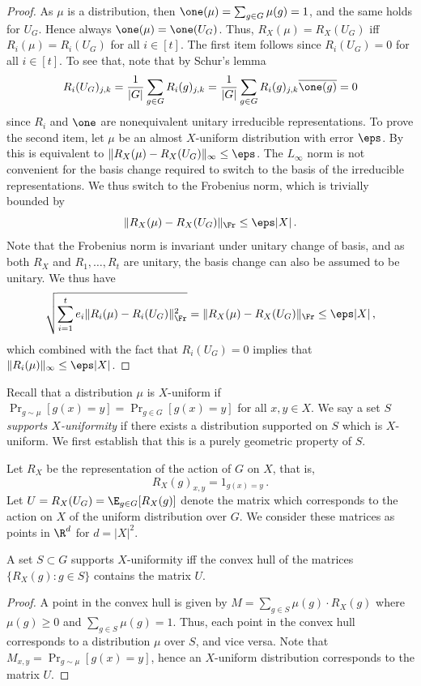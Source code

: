 \begin{proof}
As $\mu$ is a distribution, then $\one(\mu) =
\sum_{g \in G}\mu(g)=1$, and the same holds for $U_G$. Hence always
$\one(\mu)=\one(U_G)$. Thus, $R_X(\mu)=R_X(U_G)$ iff $R_i(\mu)=R_i(U_G)$
for all $i \in [t]$. The first item follows since $R_i(U_G)=0$ for all
$i \in [t]$. To see that, note that by Schur's lemma $$ R_i(U_G)_{j,k}
= \frac{1}{|G|} \sum_{g \in G} R_i(g)_{j,k} = \frac{1}{|G|} \sum_{g
\in G} R_i(g)_{j,k} \overline{\one(g)} = 0 $$ since $R_i$ and $\one$
are nonequivalent unitary irreducible representations. To prove the
second item, let $\mu$ be an almost $X$-uniform distribution with
error $\eps$. By  this is
equivalent to $\|R_X(\mu)-R_X(U_G)\|_{\infty} \le \eps$. The $L_{\infty}$
norm is not convenient for the basis change required to switch to the
basis of the irreducible representations. We thus switch to the Frobenius
norm, which is trivially bounded by $$\|R_X(\mu)-R_X(U_G)\|_{\Fr}
\le \eps |X|\,.$$ Note that the Frobenius norm is invariant under
unitary change of basis, and as both $R_X$ and $R_1,\ldots,R_t$
are unitary, the basis change can also be assumed to be unitary. We
thus have $$ \sqrt{\sum_{i=1}^t e_i \|R_i(\mu)-R_i(U_G)\|^2_{\Fr}} =
\|R_X(\mu)-R_X(U_G)\|_{\Fr} \le \eps |X|\,,$$ which combined with the
fact that $R_i(U_G)=0$ implies that $\|R_i(\mu)\|_{\infty} \le \eps |X|$.
\end{proof}

Recall that a distribution $\mu$ is $X$-uniform if $\Pr_{g \sim
\mu}[g(x)=y]=\Pr_{g \in G}[g(x)=y]$ for all $x,y \in X$. We say a set $S$
\emph{supports $X$-uniformity} if there exists a distribution supported on
$S$ which is $X$-uniform. We first establish that this is a purely geometric
property of $S$.

Let $R_X$ be the representation of the action of $G$ on $X$, that
is, \[
R_X(g)_{x,y}
= 1_{g(x)=y}\,.
\]
Let $U=R_X(U_G) = \E_{g \in G} [R_X(g)]$ denote the matrix
which corresponds to the action on $X$ of the uniform distribution over
$G$. We consider these matrices as points in $\R^{d}$ for $d=|X|^2$.

\begin{proposition}\label{prop:uniform-by-convex-hull}
A set $S \subset G$ supports $X$-uniformity iff the convex
hull of the matrices $\{R_X(g): g \in S\}$ contains the matrix $U$.
\end{proposition}
\begin{proof}
A point in the convex hull is given by $M = \sum_{g \in S} \mu(g) \cdot
R_X(g)$ where $\mu(g) \ge 0$ and $\sum_{g \in S} \mu(g)=1$. Thus, each
point in the convex hull corresponds to a distribution $\mu$ over $S$,
and vice versa. Note that $M_{x,y}=\Pr_{g \sim \mu}[g(x)=y]$, hence an
$X$-uniform distribution corresponds to the matrix $U$.
\end{proof}

